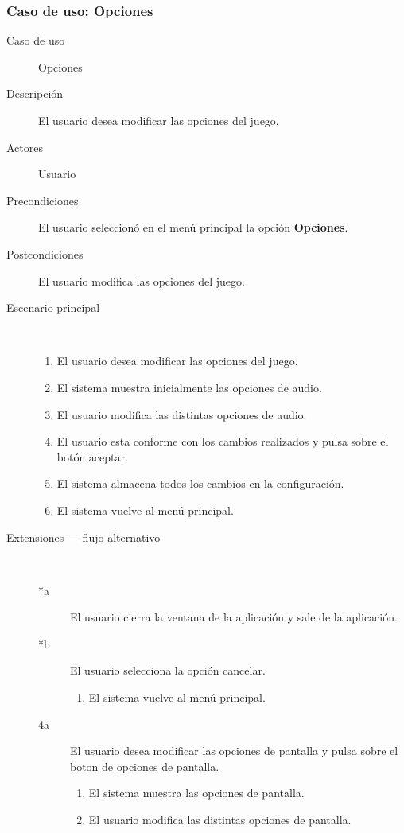 \subsubsection{Caso de uso: Opciones}

\begin{description}
    \item[Caso de uso] Opciones
    \item[Descripción] El usuario desea modificar las opciones del juego.
    \item[Actores] Usuario
    
    \item[Precondiciones] El usuario seleccionó en el menú principal la opción \textbf{Opciones}.
    \item[Postcondiciones] El usuario modifica las opciones del juego.
    
    \item[Escenario principal] $\quad$
        \begin{enumerate}
            \item El usuario desea modificar las opciones del juego.
            \item El sistema muestra inicialmente las opciones de audio.
            \item El usuario modifica las distintas opciones de audio.
            \item El usuario esta conforme con los cambios realizados y pulsa sobre el botón aceptar.
            \item El sistema almacena todos los cambios en la configuración.
            \item El sistema vuelve al menú principal.
        \end{enumerate}
    \item[Extensiones --- flujo alternativo] $\quad$
        \begin{description}
            \item[*a ] El usuario cierra la ventana de la aplicación y sale de la aplicación.
            \item[*b ] El usuario selecciona la opción cancelar.
                \begin{enumerate}
                    \item El sistema vuelve al menú principal.
                \end{enumerate}
            
            \item [4a ] El usuario desea modificar las opciones de pantalla y pulsa sobre el boton de opciones de pantalla.
                \begin{enumerate}
                    \item El sistema muestra las opciones de pantalla.
                    \item El usuario modifica las distintas opciones de pantalla.
                \end{enumerate}
            

\end{description}
\end{description}
